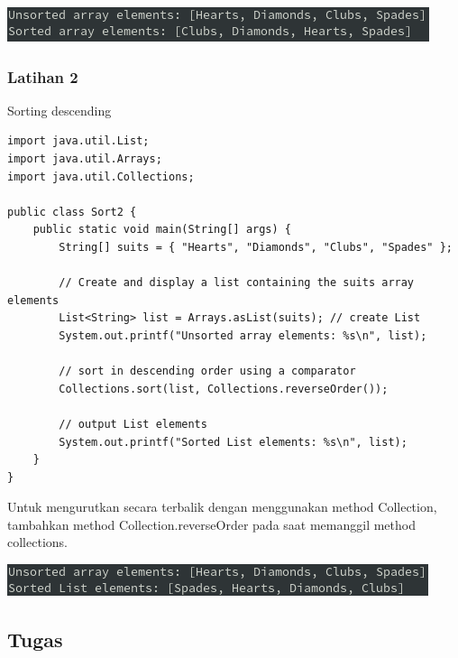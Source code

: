 \documentclass[a4paper,12pt]{article}
\begin{document}
\begin{center}
    \includegraphics[scale=0.8]{3.png} 
\end{center}

\subsubsection{Latihan 2}
Sorting descending

\begin{lstlisting}
import java.util.List;
import java.util.Arrays;
import java.util.Collections;

public class Sort2 {
    public static void main(String[] args) {
        String[] suits = { "Hearts", "Diamonds", "Clubs", "Spades" };

        // Create and display a list containing the suits array elements
        List<String> list = Arrays.asList(suits); // create List
        System.out.printf("Unsorted array elements: %s\n", list);

        // sort in descending order using a comparator
        Collections.sort(list, Collections.reverseOrder());

        // output List elements
        System.out.printf("Sorted List elements: %s\n", list);
    }
}
\end{lstlisting}
Untuk mengurutkan secara terbalik dengan menggunakan method Collection, tambahkan method Collection.reverseOrder pada
saat memanggil method collections.
\begin{center}
    \includegraphics[scale=0.8]{4.png} 
\end{center}

\newpage

\subsection{Tugas}
\end{document}
